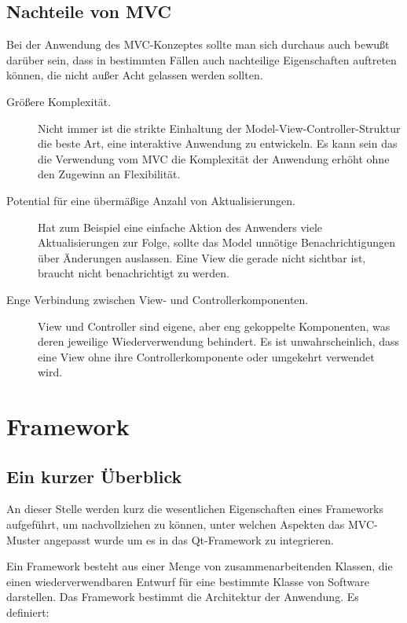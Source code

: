 \documentclass[11pt,a4paper,titlepage]{scrreprt}
\begin{document}
\section{Nachteile von MVC}
Bei der Anwendung des MVC-Konzeptes sollte man sich durchaus auch bewußt darüber sein,
dass in bestimmten Fällen auch nachteilige Eigenschaften auftreten können, die nicht 
außer Acht gelassen werden sollten. \citep[vgl. S. xx-xy]{Buschmann199801}

\begin{description}
\item[Größere Komplexität.]
Nicht immer ist die strikte Einhaltung der Model-View-Controller-Struktur die beste Art, eine
interaktive Anwendung zu entwickeln. Es kann sein das die Verwendung vom MVC die Komplexität
der Anwendung erhöht ohne den Zugewinn an Flexibilität.


\item[Potential für eine übermäßige Anzahl von Aktualisierungen.] Hat zum Beispiel eine
einfache Aktion des Anwenders viele Aktualisierungen zur Folge, sollte das Model unnötige
Benachrichtigungen über Änderungen auslassen. Eine View die gerade nicht sichtbar ist, braucht
nicht benachrichtigt zu werden.

\item[Enge Verbindung zwischen View- und Controllerkomponenten.] View und Controller sind
eigene, aber eng gekoppelte Komponenten, was deren jeweilige Wiederverwendung behindert.
Es ist unwahrscheinlich, dass eine View ohne ihre Controllerkomponente oder umgekehrt
verwendet wird.
\end{description}

\chapter{Framework}
\section{Ein kurzer Überblick}
An dieser Stelle werden kurz die wesentlichen Eigenschaften eines Frameworks aufgeführt,
um nachvollziehen zu können, unter welchen Aspekten das MVC-Muster angepasst wurde um es
in das Qt-Framework zu integrieren.{\medskip}

Ein Framework besteht aus einer Menge von zusammenarbeitenden Klassen, die einen
wiederverwendbaren Entwurf für eine bestimmte Klasse von Software darstellen. Das
Framework bestimmt die Architektur der Anwendung. Es definiert:
\end{document}
